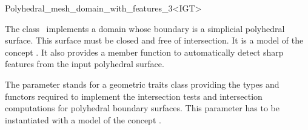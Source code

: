 \ccRefPageBegin


\begin{ccRefClass}{Polyhedral_mesh_domain_with_features_3<IGT>}  %


\ccDefinition

The class \ccRefName\ implements a domain whose 
boundary is a simplicial polyhedral surface.
This surface must be closed and free of intersection.
It is a model of the concept . It also
provides a member function to automatically detect sharp features from
the input polyhedral surface.


\ccParameters

The parameter  stands for a geometric traits class providing the types
and functors required to implement the intersection tests and intersection computations
for polyhedral boundary surfaces. This parameter has to be 
instantiated with a model of the concept .


\ccIsModel


\ccInheritsFrom
{}

\ccTypes


\ccCreation
{}  %



\end{ccRefClass}
